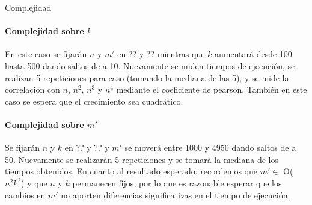 \begin{subsection}{Complejidad}


\paragraph{Complejidad sobre $k$}

En este caso se fijarán $n$ y $m'$ en ?? y ?? mientras que $k$ aumentará desde 100 hasta 500 dando saltos de a 10. Nuevamente se miden tiempos de ejecución, se realizan 5 repeticiones para caso (tomando la mediana de las 5), y se mide la correlación con $n$, $n^2$, $n^3$ y $n^4$ mediante el coeficiente de pearson. También en este caso se espera que el crecimiento sea cuadrático. 



\paragraph{Complejidad sobre $m'$}

Se fijarán $n$ y $k$ en ?? y ?? y $m'$ se moverá entre 1000 y 4950 dando saltos de a 50. Nuevamente se realizarán 5 repeticiones y se tomará la mediana de los tiempos obtenidos. En cuanto al resultado esperado, recordemos que $m' \in$ O($n^2k^2$) y que $n$ y $k$ permanecen fijos, por lo que es razonable esperar que los cambios en $m'$ no aporten diferencias significativas en el tiempo de ejecución. 



\end{subsection}


